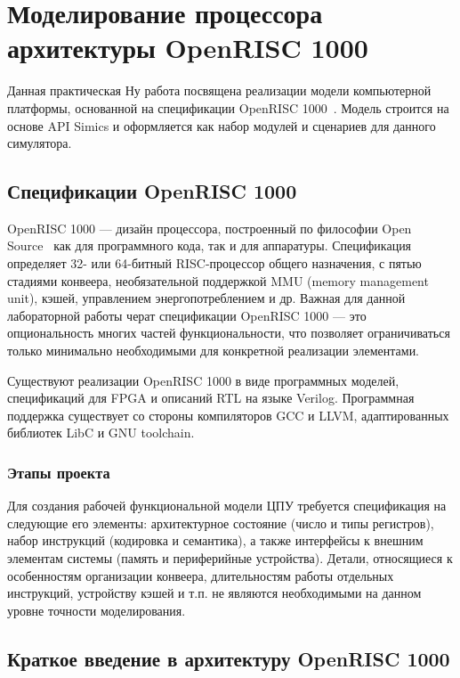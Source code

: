 \chapter{Моделирование процессора архитектуры OpenRISC 1000}\label{chap:lab06}

Данная практическая Ну работа посвящена реализации модели компьютерной платформы, основанной на спецификации OpenRISC 1000~\cite{or1k-spec}. Модель строится на основе API Simics и оформляется как набор модулей и сценариев для данного симулятора.

\section{Спецификации OpenRISC 1000}

OpenRISC 1000 --- дизайн процессора, построенный по философии Open Source~\cite{open-source-definition-ru} как для программного кода, так и для аппаратуры. Спецификация определяет 32- или 64-битный RISC-процессор общего назначения, с пятью стадиями конвеера, необязательной поддержкой MMU (\abbr memory management unit), кэшей, управлением энергопотреблением и др. Важная для данной лабораторной работы черат спецификации OpenRISC 1000 --- это опциональность многих частей функциональности, что позволяет ограничиваться только минимально необходимыми для конкретной реализации элементами.

Существуют реализации OpenRISC 1000 в виде программных моделей, спецификаций для FPGA и описаний RTL на языке Verilog. Программная поддержка существует со стороны компиляторов GCC и LLVM, адаптированных библиотек LibC и GNU toolchain.

\subsection{Этапы проекта}

Для создания рабочей функциональной модели ЦПУ требуется спецификация на следующие его элементы: архитектурное состояние (число и типы регистров), набор инструкций (кодировка и семантика), а также интерфейсы к внешним элементам системы (память и периферийные устройства). Детали, относящиеся к особенностям организации конвеера, длительностям работы отдельных инструкций, устройству кэшей и т.п. не являются необходимыми на данном уровне точности моделирования.

\section{Краткое введение в архитектуру OpenRISC 1000}

